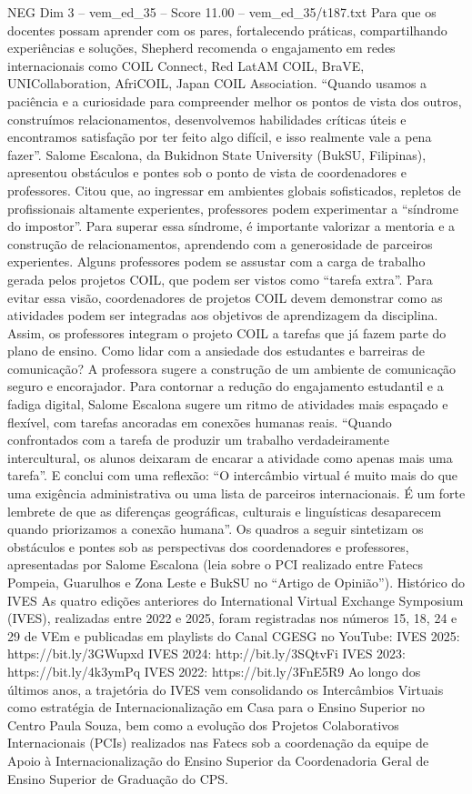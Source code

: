 \begin{textsample}{NEG Dim 3 – vem\_ed\_35 – Score 11.00 – vem\_ed\_35/t187.txt}
Para que os docentes possam aprender com os pares, fortalecendo práticas, compartilhando experiências e soluções, Shepherd recomenda o engajamento em redes internacionais como COIL Connect, Red LatAM COIL, BraVE, UNICollaboration, AfriCOIL, Japan COIL Association. “Quando usamos a paciência e a curiosidade para compreender melhor os pontos de vista dos outros, construímos relacionamentos, desenvolvemos habilidades críticas úteis e encontramos satisfação por ter feito algo difícil, e isso realmente vale a pena fazer”.
Salome Escalona, da Bukidnon State University (BukSU, Filipinas), apresentou obstáculos e pontes sob o ponto de vista de coordenadores e professores.
Citou que, ao ingressar em ambientes globais sofisticados, repletos de profissionais altamente experientes, professores podem experimentar a “síndrome do impostor”.
Para superar essa síndrome, é importante valorizar a mentoria e a construção de relacionamentos, aprendendo com a generosidade de parceiros experientes.
Alguns professores podem se assustar com a carga de trabalho gerada pelos projetos COIL, que podem ser vistos como “tarefa extra”.
Para evitar essa visão, coordenadores de projetos COIL devem demonstrar como as atividades podem ser integradas aos objetivos de aprendizagem da disciplina.
Assim, os professores integram o projeto COIL a tarefas que já fazem parte do plano de ensino.
Como lidar com a ansiedade dos estudantes e barreiras de comunicação?
A professora sugere a construção de um ambiente de comunicação seguro e encorajador.
Para contornar a redução do engajamento estudantil e a fadiga digital, Salome Escalona sugere um ritmo de atividades mais espaçado e flexível, com tarefas ancoradas em conexões humanas reais. “Quando confrontados com a tarefa de produzir um trabalho verdadeiramente intercultural, os alunos deixaram de encarar a atividade como apenas mais uma tarefa”.
E conclui com uma reflexão: “O intercâmbio virtual é muito mais do que uma exigência administrativa ou uma lista de parceiros internacionais.
É um forte lembrete de que as diferenças geográficas, culturais e linguísticas desaparecem quando priorizamos a conexão humana”.
Os quadros a seguir sintetizam os obstáculos e pontes sob as perspectivas dos coordenadores e professores, apresentadas por Salome Escalona (leia sobre o PCI realizado entre Fatecs Pompeia, Guarulhos e Zona Leste e BukSU no “Artigo de Opinião”).
Histórico do IVES As quatro edições anteriores do International Virtual Exchange Symposium (IVES), realizadas entre 2022 e 2025, foram registradas nos números 15, 18, 24 e 29 de VEm e publicadas em playlists do Canal CGESG no YouTube: IVES 2025: https://bit.ly/3GWupxd IVES 2024: http://bit.ly/3SQtvFi IVES 2023: https://bit.ly/4k3ymPq IVES 2022: https://bit.ly/3FnE5R9 Ao longo dos últimos anos, a trajetória do IVES vem consolidando os Intercâmbios Virtuais como estratégia de Internacionalização em Casa para o Ensino Superior no Centro Paula Souza, bem como a evolução dos Projetos Colaborativos Internacionais (PCIs) realizados nas Fatecs sob a coordenação da equipe de Apoio à Internacionalização do Ensino Superior da Coordenadoria Geral de Ensino Superior de Graduação do CPS.

\end{textsample}
